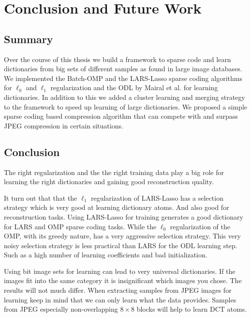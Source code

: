 \chapter{Conclusion and Future Work}

\section{Summary}
Over the course of this thesis we build a framework to sparse code and learn
dictionaries from big sets of different samples as found in large image
databases. We implemented the Batch-OMP and the LARS-Lasso sparse coding
algorithms for $\ell_0$ and $\ell_1$ regularization and the ODL by Mairal et
al. for learning dictionaries. 
In addition to this we added a cluster learning and merging strategy to the
framework to speed up learning of large dictionaries. We proposed a simple
sparse coding based compression algorithm that can compete with and surpass JPEG
compression in certain situations.


\section{Conclusion}
The right regularization and the the right training data
play a big role for learning the right dictionaries and gaining
good reconstruction quality. 

It turn out that that the $\ell_1$ regularization of LARS-Lasso has a selection
strategy which is very good at learning dictionary atoms.  And also good for
reconstruction tasks. Using LARS-Lasso for training generates a good dictionary
for LARS and OMP sparse coding tasks.
While the $\ell_0$ regularization of the OMP, with its greedy nature, has a very
aggressive selection strategy.  This very noisy selection strategy is less
practical than LARS for the ODL learning step. Such as a high number of learning
coefficients and bad initialization. 


Using bit image sets for learning can lead to very universal dictionaries. If
the images fit into the same category it is insignificant which images you
chose. The results will not much differ. When extracting samples from JPEG
images for learning keep in mind that we can only learn what the data provides.
Samples from JPEG especially non-overlapping $8 \times 8$ blocks will help to
learn DCT atoms.


